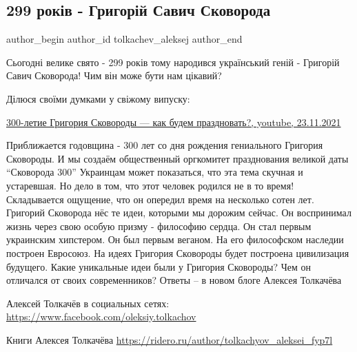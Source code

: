  
 
 
 
 
 
\subsection{299 років - Григорій Савич Сковорода}
\label{sec:03_12_2021.fb.tolkachev_aleksej.1.299_rokiv_skovoroda}
 
\ifcmt
 author_begin
   author_id tolkachev_aleksej
 author_end
\fi

Сьогодні велике свято - 299 років тому народився український геній - Григорій
Савич Сковорода! Чим він може бути нам цікавий?

Ділюся своїми думками у свіжому випуску: 

\href{https://youtu.be/3BK6xlQucXw}{%
300-летие Григория Сковороды — как будем праздновать?, %
youtube, 23.11.2021%
}

\begin{multicols}{2}
Приближается годовщина - 300 лет со дня рождения гениального Григория
Сковороды. И мы создаём общественный оргкомитет празднования великой даты
\enquote{Сковорода 300} Украинцам может показаться, что эта тема скучная и устаревшая.
Но дело в том, что этот человек родился не в то время! Складывается ощущение,
что он опередил время на несколько сотен лет. Григорий Сковорода нёс те идеи,
которыми мы дорожим сейчас. Он воспринимал жизнь через свою особую призму -
философию сердца. Он стал первым украинским хипстером. Он был первым веганом.
На его философском наследии построен Евросоюз. На идеях Григория Сковороды
будет построена цивилизация будущего. Какие уникальные идеи были у Григория
Сковороды? Чем он отличался от своих  современников? Ответы – в новом блоге
Алексея Толкачёва

Алексей Толкачёв в социальных сетях:
\url{https://www.facebook.com/oleksiy.tolkachov}

Книги Алексея Толкачёва \url{https://ridero.ru/author/tolkachyov_aleksei_fyp7l}

\end{multicols}

